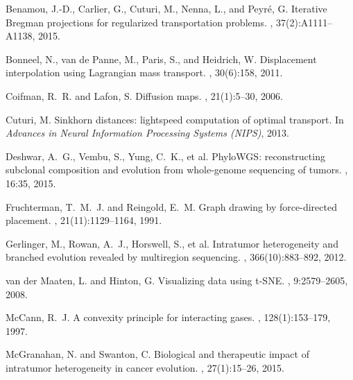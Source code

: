 \documentclass{article}
\begin{document}
\small

\begin{thebibliography}{}

Benamou, J.-D., Carlier, G., Cuturi, M., Nenna, L., and Peyr\'e, G.
\newblock Iterative Bregman projections for regularized transportation problems.
, 37(2):A1111--A1138, 2015.

Bonneel, N., van de Panne, M., Paris, S., and Heidrich, W.
\newblock Displacement interpolation using Lagrangian mass transport.
, 30(6):158, 2011.

Coifman, R.~R. and Lafon, S.
\newblock Diffusion maps.
, 21(1):5--30, 2006.

Cuturi, M.
\newblock Sinkhorn distances: lightspeed computation of optimal transport.
\newblock In {\em Advances in Neural Information Processing Systems (NIPS)}, 2013.

Deshwar, A.~G., Vembu, S., Yung, C.~K., et al.
\newblock PhyloWGS: reconstructing subclonal composition and evolution from
whole-genome sequencing of tumors.
, 16:35, 2015.

Fruchterman, T.~M.~J. and Reingold, E.~M.
\newblock Graph drawing by force-directed placement.
, 21(11):1129--1164, 1991.

Gerlinger, M., Rowan, A.~J., Horswell, S., et al.
\newblock Intratumor heterogeneity and branched evolution revealed by multiregion
sequencing.
, 366(10):883--892, 2012.

van der Maaten, L. and Hinton, G.
\newblock Visualizing data using t-SNE.
, 9:2579--2605, 2008.

McCann, R.~J.
\newblock A convexity principle for interacting gases.
, 128(1):153--179, 1997.

McGranahan, N. and Swanton, C.
\newblock Biological and therapeutic impact of intratumor heterogeneity in cancer
evolution.
, 27(1):15--26, 2015.


\end{thebibliography}
\end{document}
